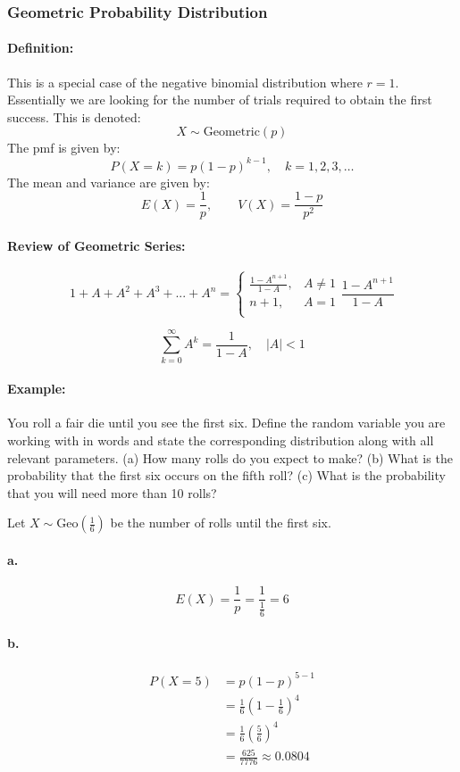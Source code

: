 \subsubsection*{Geometric Probability Distribution}
\paragraph*{Definition:}
This is a special case of the negative binomial distribution where $r=1$. Essentially we are looking for the number of trials required 
to obtain the first success. This is denoted:
\[
    X \sim \text{Geometric}(p)
\]
The pmf is given by:
\[
    P(X=k) = p(1-p)^{k-1}, \quad k=1,2,3,\dots
\]
The mean and variance are given by:
\[
    E(X) = \frac{1}{p}, \qquad V(X) = \frac{1-p}{p^2}
\]

\paragraph*{Review of Geometric Series:}
\[
    1+A+A^2+A^3+...+A^n = \begin{cases}
        \frac{1-A^{n+1}}{1-A}, & A \neq 1\\
        n+1, & A=1 \\
    \end{cases}\frac{1-A^{n+1}}{1-A}
\]

\[
    \sum_{k=0}^{\infty} A^k = \frac{1}{1-A}, \quad |A|<1
\]

\paragraph*{Example:}
You roll a fair die until you see the first six. Define the random variable you are working with in words and state 
the corresponding distribution along with all relevant parameters. (a) How many rolls do you expect to make? (b) What is the 
probability that the first six occurs on the fifth roll? (c) What  is the probability that you will need more than 10 rolls?

Let $X \sim \text{Geo}(\frac{1}{6})$ be the number of rolls until the first six.
\paragraph*{a.}

\[
    E(X) = \frac{1}{p} = \frac{1}{\frac{1}{6}} = 6
\]

\paragraph*{b.}
\begin{align*}
    P(X=5) &= p(1-p)^{5-1} \\
    &= \frac{1}{6} \left(1-\frac{1}{6}\right)^4 \\
    &= \frac{1}{6} \left(\frac{5}{6}\right)^4 \\
    &= \frac{625}{7776} \approx 0.0804
\end{align*}

